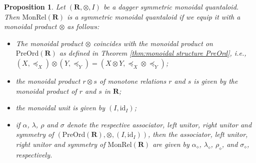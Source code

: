\documentclass[12pt]{tac}
\newtheorem{proposition}[theorem]{Proposition}
\theoremstyle{definition}
\theoremstyle{remark}
\newcommand{\qo}{{\boldsymbol{\preccurlyeq}}}
\newcommand{\<}{\langle}
\renewcommand{\>}{\rangle}
\renewcommand{\:}{\colon}
\newcommand{\id}{\mathrm{id}}
\begin{document}
\begin{proposition}\label{prop:MonRel is symmetric monoidal}
   Let $(\mathbf R,\otimes,I)$ be a dagger symmetric monoidal quantaloid. Then
   $\mathrm{MonRel}(\mathbf R)$ is a symmetric monoidal quantaloid if we equip it with a monoidal product $\otimes$ as follows:
   \begin{itemize}
       \item The monoidal product $\otimes$ coincides with the monoidal product on $\mathrm{PreOrd}(\mathbf R)$ as defined in Theorem \ref{thm:monoidal structure PreOrd}, i.e., $(X,\qo_X)\otimes (Y,\qo_Y)=(X\otimes Y,\qo_X\otimes\qo_Y)$;
       \item the monoidal product $r\otimes s$ of monotone relations $r$ and $s$ is given by the monoidal product of $r$ and $s$ in $\mathbf R$;
       \item the monoidal unit is given by $(I,\id_I)$;
       \item if $\alpha$, $\lambda$, $\rho$ and $\sigma$ denote the respective associator, left unitor, right unitor and symmetry of $(\mathrm{PreOrd}(\mathbf R),\otimes,(I,\id_I))$, then  the associator, left unitor, right unitor and symmetry of $\mathrm{MonRel}(\mathbf R)$ are given by $\alpha_\diamond$, $\lambda_\diamond$, $\rho_\diamond$, and $\sigma_\diamond$, respectively.
   \end{itemize}
\end{proposition}
\end{document}
